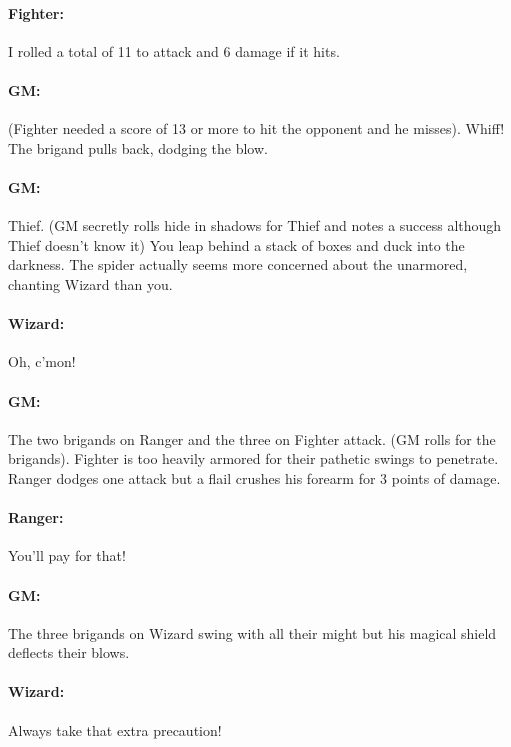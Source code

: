 \begin{multicols}{2}
\paragraph{Fighter:}  I rolled a total of 11 to attack and 6 damage if it hits.

\paragraph{GM:}  (Fighter needed a score of 13 or more to hit the opponent and he misses).  Whiff! The brigand pulls back, dodging the blow.  

\paragraph{GM:}  Thief. (GM secretly rolls hide in shadows for Thief and notes a success although Thief doesn't know it)  You leap behind a stack of boxes and duck into the darkness.  The spider actually seems more concerned about the unarmored, chanting Wizard than you.

\paragraph{Wizard:} Oh, c'mon!

\paragraph{GM:}  The two brigands on Ranger and the three on Fighter attack.  (GM rolls for the brigands).  Fighter is too heavily armored for their pathetic swings to penetrate.  Ranger dodges one attack but a flail crushes his forearm for 3 points of damage.

\paragraph{Ranger:}  You'll pay for that!

\paragraph{GM:}  The three brigands on Wizard swing with all their might but his magical shield deflects their blows.

\paragraph{Wizard:}  Always take that extra precaution!


\end{multicols}
